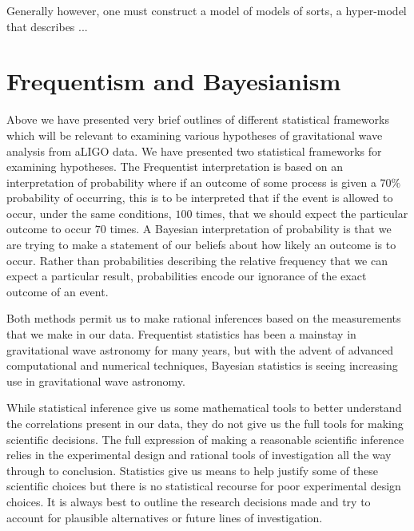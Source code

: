 Generally however, one must construct a model of models of sorts, a hyper-model that describes ...

\section{Frequentism and Bayesianism}
Above we have presented very brief outlines of different statistical frameworks which will be relevant to examining various hypotheses of gravitational wave analysis from aLIGO data. We have presented two statistical frameworks for examining hypotheses. The Frequentist interpretation is based on an interpretation of probability where if an outcome of some process is given a $70\%$ probability of occurring, this is to be interpreted that if the event is allowed to occur, under the same conditions, $100$ times, that we should expect the particular outcome to occur $70$ times. A Bayesian interpretation of probability is that we are trying to make a statement of our beliefs about how likely an outcome is to occur. Rather than probabilities describing the relative frequency that we can expect a particular result, probabilities encode our ignorance of the exact outcome of an event.

Both methods permit us to make rational inferences based on the measurements that we make in our data. Frequentist statistics has been a mainstay in gravitational wave astronomy for many years, but with the advent of advanced computational and numerical techniques, Bayesian statistics is seeing increasing use in gravitational wave astronomy.

While statistical inference give us some mathematical tools to better understand the correlations present in our data, they do not give us the full tools for making scientific decisions. The full expression of making a reasonable scientific inference relies in the experimental design and rational tools of investigation all the way through to conclusion. Statistics give us means to help justify some of these scientific choices but there is no statistical recourse for poor experimental design choices. It is always best to outline the research decisions made and try to account for plausible alternatives or future lines of investigation.
